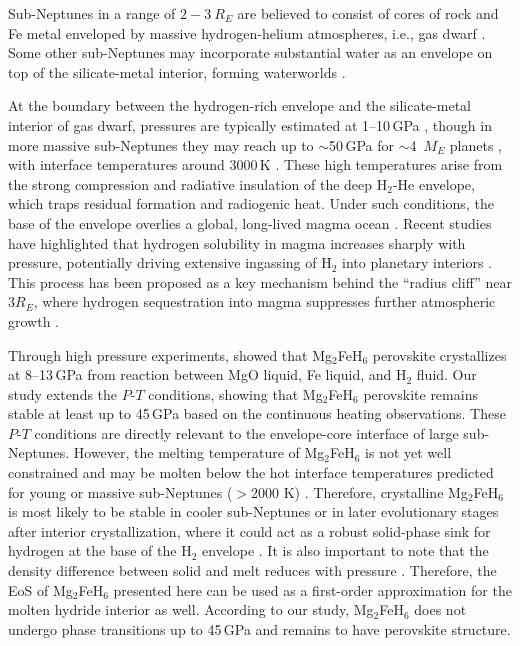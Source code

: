 \documentclass[draft,jgrga,12pt]{agujournal2019}
\begin{document}
Sub-Neptunes in a range of $2{-}3~R_{E}$ are believed to consist of cores of rock and Fe metal enveloped by massive hydrogen-helium atmospheres, i.e., gas dwarf \cite{wolfgang_how_2015, jontof-hutter_secure_2016}.  
Some other sub-Neptunes may incorporate substantial water as an envelope on top of the silicate-metal interior, forming waterworlds \cite{luque_density_2022, tsiaras_water_2019, benneke_water_2019, burn_radius_2024, venturini_nature_2020}.

At the boundary between the hydrogen-rich envelope and the silicate-metal interior of gas dwarf, pressures are typically estimated at 1--10\,{GPa} \cite{kite_superabundance_2019, kite_atmosphere_2020}, though in more massive sub-Neptunes they may reach up to $\sim$50\,{GPa} for $\sim$4~$M_{E}$ planets \cite{schlichting_chemical_2022}, with interface temperatures around 3000\,K \cite{horn_building_2025}. 
These high temperatures arise from the strong compression and radiative insulation of the deep H$_2$-He envelope, which traps residual formation and radiogenic heat.
Under such conditions, the base of the envelope overlies a global, long-lived magma ocean \cite{vazan_contribution_2018,vazan_rocky_2023, kite_atmosphere_2020, schlichting_chemical_2022}. 
Recent studies have highlighted that hydrogen solubility in magma increases sharply with pressure, potentially driving extensive ingassing of H$_2$ into planetary interiors \cite{hirschmann_solubility_2012, olson_nebular_2019,kimura_predicted_2022, young_phase_2024, gilmore_core_2026}.  
This process has been proposed as a key mechanism behind the ``radius cliff'' near $3R_{E}$, where hydrogen sequestration into magma suppresses further atmospheric growth \cite{kite_superabundance_2019, kim_stability_2023}.

Through high pressure experiments,  showed that Mg$_2$FeH$_6$ perovskite crystallizes at 8--13\,{GPa} from reaction between MgO liquid, Fe liquid, and H$_2$ fluid. 
Our study extends the $P$-$T$ conditions, showing that Mg$_2$FeH$_6$ perovskite remains stable at least up to 45\,{GPa} based on the continuous heating observations.
These $P$-$T$ conditions are directly relevant to the envelope-core interface of large sub-Neptunes. %
However, the melting temperature of Mg$_2$FeH$_6$ is not yet well constrained and may be molten below the hot interface temperatures predicted for young or massive sub-Neptunes ($>$2000 K) \cite{kite_atmosphere_2020}. 
Therefore, crystalline Mg$_2$FeH$_6$ is most likely to be stable in cooler sub-Neptunes or in later evolutionary stages after interior crystallization, where it could act as a robust solid-phase sink for hydrogen at the base of the H$_2$ envelope \cite{kim_stability_2023}. 
It is also important to note that the density difference between solid and melt reduces with pressure \addcite.  
Therefore, the EoS of Mg$_2$FeH$_6$ presented here can be used as a first-order approximation for the molten hydride interior as well.
According to our study, Mg$_2$FeH$_6$ does not undergo phase transitions up to 45\,{GPa} and remains to have perovskite structure. 
\end{document}
